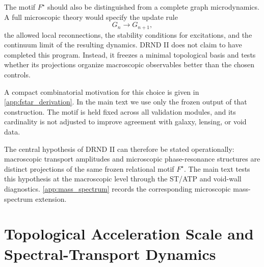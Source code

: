 \documentclass[12pt]{iopart}
\begin{document}
The motif \(F^\star\) should also be distinguished from a complete graph microdynamics. A full microscopic theory would specify the update rule
\begin{equation}
G_n\longrightarrow G_{n+1},
\end{equation}
the allowed local reconnections, the stability conditions for excitations, and the continuum limit of the resulting dynamics. DRND II does not claim to have completed this program. Instead, it freezes a minimal topological basis and tests whether its projections organize macroscopic observables better than the chosen controls.

A compact combinatorial motivation for this choice is given in \ref{app:fstar_derivation}. In the main text we use only the frozen output of that construction. The motif is held fixed across all validation modules, and its cardinality is not adjusted to improve agreement with galaxy, lensing, or void data.

The central hypothesis of DRND II can therefore be stated operationally: macroscopic transport amplitudes and microscopic phase-resonance structures are distinct projections of the same frozen relational motif \(F^\star\). The main text tests this hypothesis at the macroscopic level through the ST/ATP and void-wall diagnostics. \ref{app:mass_spectrum} records the corresponding microscopic mass-spectrum extension.

\section{Topological Acceleration Scale and Spectral-Transport Dynamics}
\label{sec:st_dynamics}
\end{document}
